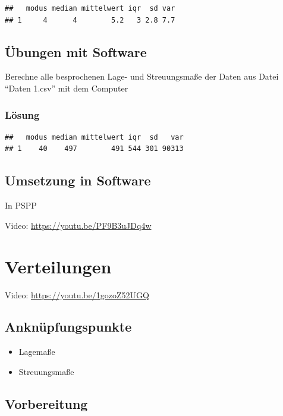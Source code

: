 \documentclass[
]{book}
\providecommand{\tightlist}{%
  \setlength{\itemsep}{0pt}\setlength{\parskip}{0pt}}
\begin{document}
\begin{verbatim}
##   modus median mittelwert iqr  sd var
## 1     4      4        5.2   3 2.8 7.7
\end{verbatim}

\hypertarget{uxfcbungen-mit-software}{%
\section{Übungen mit Software}\label{uxfcbungen-mit-software}}

Berechne alle besprochenen Lage- und Streuungsmaße der Daten aus Datei ``Daten 1.csv'' mit dem Computer

\hypertarget{luxf6sung}{%
\subsection{Lösung}\label{luxf6sung}}

\begin{verbatim}
##   modus median mittelwert iqr  sd   var
## 1    40    497        491 544 301 90313
\end{verbatim}

\hypertarget{umsetzung-in-software}{%
\section{Umsetzung in Software}\label{umsetzung-in-software}}

In PSPP

Video: \url{https://youtu.be/PF9B3uJDq4w}

\hypertarget{verteilungen}{%
\chapter{Verteilungen}\label{verteilungen}}

Video: \url{https://youtu.be/1gozoZ52UGQ}

\hypertarget{anknuxfcpfungspunkte-1}{%
\section{Anknüpfungspunkte}\label{anknuxfcpfungspunkte-1}}

\begin{itemize}
\tightlist
\item
  Lagemaße
\item
  Streuungsmaße
\end{itemize}

\hypertarget{vorbereitung-1}{%
\section{Vorbereitung}\label{vorbereitung-1}}
\end{document}
